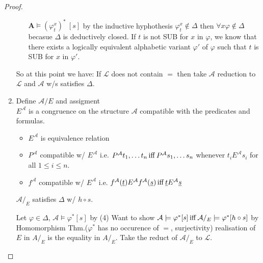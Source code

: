 \begin{proof}
\begin{enumerate}
\begin{claimproof}
\begin{itemize}
                $\mathbf{A} \vDash (\varphi^x_t)^*\:  [s]$ by the inductive hyphothesis $\varphi^x_t\notin\Delta$ then $\forall x \varphi \notin \Delta$ becasue $\Delta$ is deductively closed.
                If $t$ is not SUB for $x$ in $\varphi$, we know that there exists a logically equivalent alphabetic variant $\varphi'$ of $\varphi$ such that $t$ is SUB for $x$ in $\varphi'$.
            \end{itemize}
        \end{claimproof} 
        So at this point we have: 
        If $\mathcal{L}$ does not contain $=$ then take $\mathcal{A}$ reduction to $\mathcal{L}$ and $\mathcal{A}$ w/s satisfies $\Delta$.
        \item Define $\mathcal{A}/E$ and assigment \\
         $E^\mathcal{A}$ is a congruence on the structure $\mathcal{A}$ compatible with the predicates and formulas.
        \begin{itemize}
            \item $E^\mathcal{A}$ is equivalence relation
            \item $P^\mathcal{A}$ compatible w/ $E^\mathcal{A}$ i.e. $P^\mathcal{A}t_1,\dots t_n \operatorname{iff} P^\mathcal{A} s_1,\dots s_n$ whenever $t_i E^\mathcal{A} s_i$ for all $1\leq i \leq n$.
            \item $f^\mathcal{A}$ compatible w/ $E^\mathcal{A}$ i.e. $f^\mathcal{A}(\underline{t})E^\mathcal{A} f^\mathcal{A}(\underline{s})\operatorname{iff} \underline{t}E^\mathcal{A}\underline{s}$
        \end{itemize}
         $\mathcal{A}/_E$ satisfies $\Delta$ w/ $h\circ s$.
        \begin{claimproof}
            Let $\varphi\in \Delta$, $\mathcal{A}\models \varphi^*[s]$ by (4)
            Want to show $\mathcal{A}\models \varphi^*[s] \operatorname{iff} \mathcal{A}/_E \models \varphi^* [h\circ s]$ by Homomorphism Thm.($\varphi^*$ has no occurence of $=$, surjectivity)
            realisation of $E$ in $A/_E$ is the equality in $A/_E$.
            Take the reduct of $\mathcal{A}/_E$ to $\mathcal{L}$. 
        \end{claimproof}
    \end{enumerate}
\end{proof}

